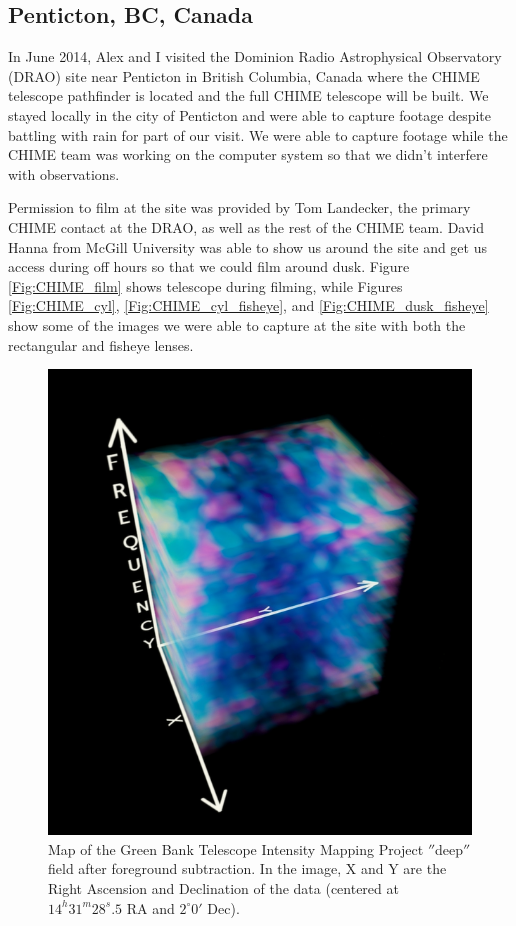 \subsection{Penticton, BC, Canada}
In June 2014, Alex and I visited the Dominion Radio Astrophysical Observatory (DRAO) site near Penticton in British Columbia, Canada where the CHIME telescope pathfinder is located and the full CHIME telescope will be built. We stayed locally in the city of Penticton and were able to capture footage despite battling with rain for part of our visit. We were able to capture footage while the CHIME team was working on the computer system so that we didn't interfere with observations. 

Permission to film at the site was provided by Tom Landecker, the primary CHIME contact at the DRAO, as well as the rest of the CHIME team. David Hanna from McGill University was able to show us around the site and get us access during off hours so that we could film around dusk. Figure \ref{Fig:CHIME_film} shows telescope during filming, while Figures \ref{Fig:CHIME_cyl}, \ref{Fig:CHIME_cyl_fisheye}, and \ref{Fig:CHIME_dusk_fisheye} show some of the images we were able to capture at the site with both the rectangular and fisheye lenses. 

\begin{figure}[htb]
\begin{center}
\includegraphics[width=0.95\linewidth]{Planetarium/figures/GBT_cm_map.jpg}
\caption{Map of the Green Bank Telescope Intensity Mapping Project $''$deep$''$ field after foreground subtraction. In the image, X and Y are the Right Ascension and Declination of the data (centered at $14^h 31^m 28^s.5$ RA and $2^\circ 0'$ Dec). }
\label{Fig:GBT_cm_map}
\end{center}
\end{figure}

